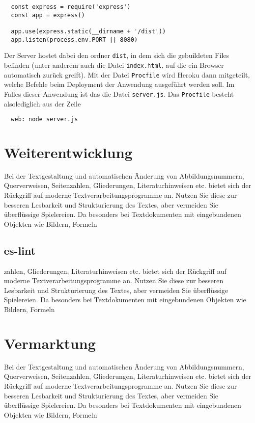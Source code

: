 \begin{lstlisting}
  const express = require('express')
  const app = express()

  app.use(express.static(__dirname + '/dist'))
  app.listen(process.env.PORT || 8080)
\end{lstlisting}

Der Server hostet dabei den ordner \verb|dist|, in dem sich die gebuildeten Files befinden (unter anderem auch die Datei \verb|index.html|, auf die ein Browser automatisch zurück greift). Mit der Datei \verb|Procfile| wird Heroku dann mitgeteilt, welche Befehle beim Deployment der Anwendung ausgeführt werden soll. Im Falles dieser Anwendung ist das die Datei \verb|server.js|. Das \verb|Procfile| besteht alsolediglich aus der Zeile

\begin{lstlisting}
  web: node server.js
\end{lstlisting}



\section{Weiterentwicklung}
Bei der Textgestaltung und automatischen Änderung von Abbildungsnummern, Querverweisen,
Seitenzahlen, Gliederungen, Literaturhinweisen etc. bietet sich der Rückgriff
auf moderne Textverarbeitungsprogramme an. Nutzen Sie diese zur besseren Lesbarkeit
und Strukturierung des Textes, aber vermeiden Sie überflüssige Spielereien. Da
besonders bei Textdokumenten mit eingebundenen Objekten wie Bildern, Formeln

\subsection{es-lint}
zahlen, Gliederungen, Literaturhinweisen etc. bietet sich der Rückgriff
auf moderne Textverarbeitungsprogramme an. Nutzen Sie diese zur besseren Lesbarkeit
und Strukturierung des Textes, aber vermeiden Sie überflüssige Spielereien. Da
besonders bei Textdokumenten mit eingebundenen Objekten wie Bildern, Formeln

\section{Vermarktung}
Bei der Textgestaltung und automatischen Änderung von Abbildungsnummern, Querverweisen,
Seitenzahlen, Gliederungen, Literaturhinweisen etc. bietet sich der Rückgriff
auf moderne Textverarbeitungsprogramme an. Nutzen Sie diese zur besseren Lesbarkeit
und Strukturierung des Textes, aber vermeiden Sie überflüssige Spielereien. Da
besonders bei Textdokumenten mit eingebundenen Objekten wie Bildern, Formeln
